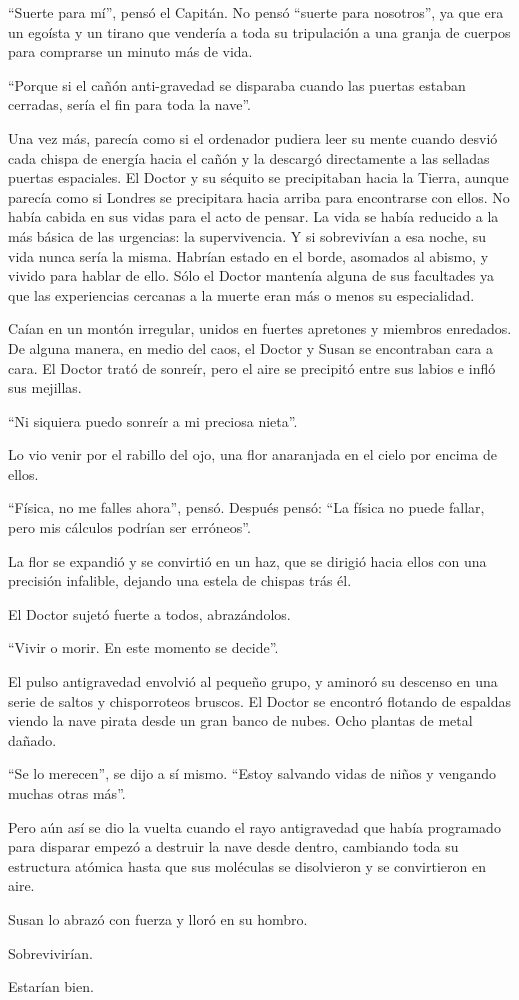 ``Suerte para mí'', pensó el Capitán. No pensó  ``suerte para nosotros'', ya que era un egoísta y un tirano que vendería a toda su tripulación a una granja de cuerpos para comprarse un minuto más de vida.

``Porque si el cañón anti-gravedad se disparaba cuando las puertas estaban cerradas, sería el fin para toda la nave''.

Una vez más, parecía como si el ordenador pudiera leer su mente cuando desvió cada chispa de energía hacia el cañón y la descargó directamente a las selladas puertas espaciales.
El Doctor y su séquito se precipitaban hacia la Tierra, aunque parecía como si Londres se precipitara hacia arriba para encontrarse con ellos. No había cabida en sus vidas para el acto de pensar. La vida se había reducido a la más básica de las urgencias: la supervivencia. Y si sobrevivían a esa noche, su vida nunca sería la misma. Habrían estado en el borde, asomados al abismo, y vivido para hablar de ello. Sólo el Doctor mantenía alguna de sus facultades ya que  las experiencias cercanas a la muerte eran más o menos su especialidad.

Caían en un montón irregular, unidos en fuertes apretones y miembros enredados. De alguna manera, en medio del caos, el Doctor y Susan se encontraban cara a cara. El Doctor trató de sonreír, pero el aire se precipitó entre sus labios e infló sus mejillas.

``Ni siquiera puedo sonreír a mi preciosa nieta''.

Lo vio venir por el rabillo del ojo, una flor anaranjada en el cielo por encima de ellos.

``Física, no me falles ahora'', pensó. Después pensó: ``La física no puede fallar, pero mis cálculos podrían ser erróneos''.

La flor se expandió y se convirtió en un haz, que se dirigió hacia ellos con una precisión infalible, dejando una estela de chispas trás él.

El Doctor sujetó fuerte a todos, abrazándolos.

``Vivir o morir. En este momento se decide''.

El pulso antigravedad envolvió al pequeño grupo, y aminoró su descenso en una serie de saltos y chisporroteos bruscos. El Doctor se encontró flotando de espaldas viendo la nave pirata desde un gran banco de nubes. Ocho plantas de metal dañado.

``Se lo merecen'', se dijo a sí mismo. ``Estoy salvando vidas de niños y vengando muchas otras más''.

Pero aún así se dio la vuelta cuando el rayo antigravedad que había programado para disparar empezó a destruir la nave desde dentro, cambiando toda su estructura atómica hasta que sus moléculas se disolvieron y se convirtieron en aire.

Susan lo abrazó con fuerza y lloró en su hombro.

Sobrevivirían.

Estarían bien.